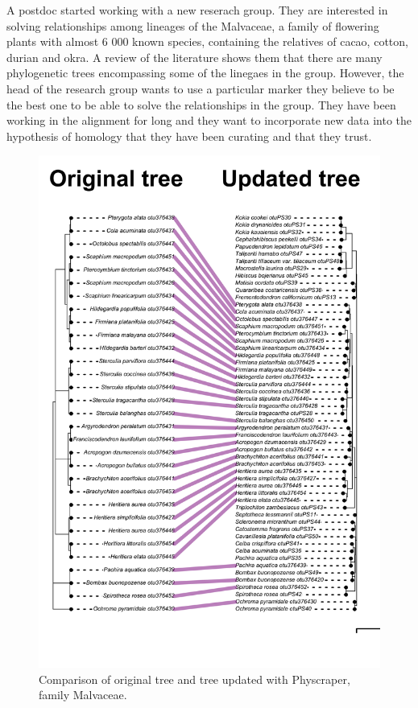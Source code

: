 \documentclass[]{article}
\begin{document}
A postdoc started working with a new reserach group. They are interested in solving relationships among lineages of the Malvaceae, a family of flowering plants with almost 6 000 known species, containing the relatives of cacao, cotton, durian and okra.
A review of the literature shows them that there are many phylogenetic trees encompassing some of the linegaes in the group. However, the head of the research group wants to use a particular marker they believe to be the best one to be able to solve the relationships in the group. They have been working in the alignment for long and they want to incorporate new data into the hypothesis of homology that they have been curating and that they trust.

\begin{figure}

{\centering \includegraphics[width=0.85\linewidth]{docs/figs/cotree-plot2-1} 

}

\caption{Comparison of original tree and tree updated with Physcraper, family Malvaceae.}\label{fig:fig-2}
\end{figure}
\newpage
\end{document}
